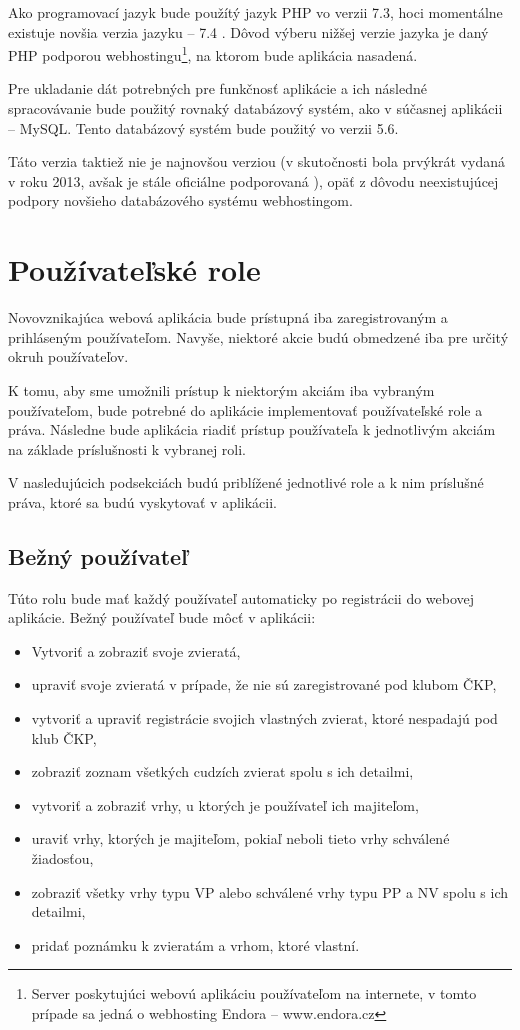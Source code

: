 Ako programovací jazyk bude použítý jazyk PHP vo verzii 7.3, hoci momentálne existuje novšia verzia jazyku -- 7.4 \cite{verzie-php}.
Dôvod výberu nižšej verzie jazyka je daný PHP podporou webhostingu\footnote{Server poskytujúci webovú aplikáciu používateľom na internete, v tomto prípade sa jedná o webhosting Endora -- www.endora.cz}, na ktorom bude aplikácia nasadená.

Pre ukladanie dát potrebných pre funkčnosť aplikácie a ich následné spracovávanie bude použitý rovnaký databázový systém, ako v súčasnej aplikácii -- MySQL. Tento databázový systém bude použitý vo verzii 5.6.

Táto verzia taktiež nie je najnovšou verziou (v skutočnosti bola prvýkrát vydaná v roku 2013, avšak je stále oficiálne podporovaná \cite{verzie-mysql}), opäť z dôvodu neexistujúcej podpory novšieho databázového systému webhostingom.

\pagebreak

\section{Používateľské role}\label{pouzivatelske-role}
Novovznikajúca webová aplikácia bude prístupná iba zaregistrovaným a prihláseným používateľom. Navyše, niektoré akcie budú obmedzené iba pre určitý okruh používateľov.

K tomu, aby sme umožnili prístup k niektorým akciám iba vybraným používateľom, bude potrebné do aplikácie implementovať používateľské role a práva. Následne bude aplikácia riadiť prístup používateľa k jednotlivým akciám na základe príslušnosti k vybranej roli.

V nasledujúcich podsekciách budú priblížené jednotlivé role a k nim príslušné práva, ktoré sa budú vyskytovať v aplikácii.

\subsection{Bežný používateľ}\label{bezny-pouzivatel}
Túto rolu bude mať každý používateľ automaticky po registrácii do webovej aplikácie. Bežný používateľ bude môcť v aplikácii: 

\begin{itemize}
	\item Vytvoriť a zobraziť svoje zvieratá,
	\item upraviť svoje zvieratá v prípade, že nie sú zaregistrované pod klubom ČKP,
	\item vytvoriť a upraviť registrácie svojich vlastných zvierat, ktoré nespadajú pod klub ČKP,
	\item zobraziť zoznam všetkých cudzích zvierat spolu s ich detailmi,
	\item vytvoriť a zobraziť vrhy, u ktorých je používateľ ich majiteľom,
	\item uraviť vrhy, ktorých je majiteľom, pokiaľ neboli tieto vrhy schválené žiadosťou,
	\item zobraziť všetky vrhy typu VP alebo schválené vrhy typu PP a NV spolu s ich detailmi,
	\item pridať poznámku k zvieratám a vrhom, ktoré vlastní.
\end{itemize}

